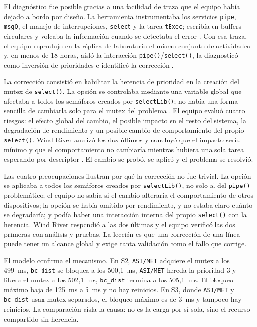 \documentclass[journal]{IEEEtran}
\begin{document}
El diagnóstico fue posible gracias a una facilidad de traza que el equipo había dejado a bordo por diseño. La herramienta instrumentaba los servicios \texttt{pipe}, \texttt{msgQ}, el manejo de interrupciones, \texttt{select} y la tarea \texttt{tExec}; escribía en buffers circulares y volcaba la información cuando se detectaba el error \cite{reeves1997mars,reeves1999priority}. Con esa traza, el equipo reprodujo en la réplica de laboratorio el mismo conjunto de actividades y, en menos de 18 horas, aisló la interacción \texttt{pipe()}/\texttt{select()}, la diagnosticó como inversión de prioridades e identificó la corrección \cite{reeves1999priority}.

La corrección consistió en habilitar la herencia de prioridad en la creación del mutex de \texttt{select()}. La opción se controlaba mediante una variable global que afectaba a todos los semáforos creados por \texttt{selectLib()}; no había una forma sencilla de cambiarla solo para el mutex del problema \cite{reeves1999priority}. El equipo evaluó cuatro riesgos: el efecto global del cambio, el posible impacto en el resto del sistema, la degradación de rendimiento y un posible cambio de comportamiento del propio \texttt{select()}. Wind River analizó los dos últimos y concluyó que el impacto sería mínimo y que el comportamiento no cambiaría mientras hubiera una sola tarea esperando por descriptor \cite{reeves1999priority}. El cambio se probó, se aplicó y el problema se resolvió.

Las cuatro preocupaciones ilustran por qué la corrección no fue trivial. La opción se aplicaba a todos los semáforos creados por \texttt{selectLib()}, no solo al del \texttt{pipe()} problemático; el equipo no sabía si el cambio alteraría el comportamiento de otros dispositivos; la opción se había omitido por rendimiento, y no estaba claro cuánto se degradaría; y podía haber una interacción interna del propio \texttt{select()} con la herencia. Wind River respondió a las dos últimas y el equipo verificó las dos primeras con análisis y pruebas. La lección es que una corrección de una línea puede tener un alcance global y exige tanta validación como el fallo que corrige.

El modelo confirma el mecanismo. En S2, \texttt{ASI/MET} adquiere el mutex a los 499~ms, \texttt{bc\_dist} se bloquea a los 500,1~ms, \texttt{ASI/MET} hereda la prioridad 3 y libera el mutex a los 502,1~ms; \texttt{bc\_dist} termina a los 505,1~ms. El bloqueo máximo baja de 125~ms a 5~ms y no hay reinicios. En S3, donde \texttt{ASI/MET} y \texttt{bc\_dist} usan mutex separados, el bloqueo máximo es de 3~ms y tampoco hay reinicios. La comparación aísla la causa: no es la carga por sí sola, sino el recurso compartido sin herencia.
\end{document}

